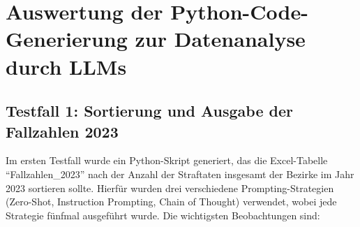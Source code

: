 \documentclass[11pt,a4paper]{article}
\begin{document}
\section{Auswertung der Python-Code-Generierung zur Datenanalyse durch LLMs}
\label{sec:auswertung}
\subsection{Testfall 1: Sortierung und Ausgabe der Fallzahlen 2023}
\label{subsec:auswertung_testfall1 }
    
Im ersten Testfall wurde ein Python-Skript generiert, das die Excel-Tabelle \enquote{Fallzahlen\_2023} nach der Anzahl der Straftaten insgesamt der Bezirke im Jahr 2023 sortieren sollte. Hierfür wurden drei verschiedene Prompting-Strategien (Zero-Shot, Instruction Prompting, Chain of Thought) verwendet, wobei jede Strategie fünfmal ausgeführt wurde. Die wichtigsten Beobachtungen sind:
    
\end{document}
